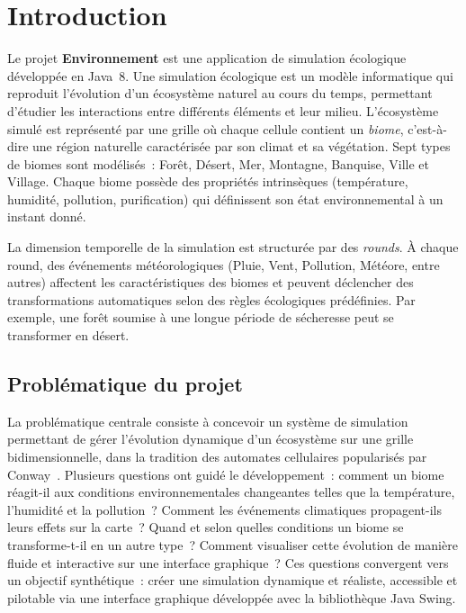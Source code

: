 \section{Introduction}
\label{sec:introduction}

Le projet \textbf{Environnement} est une application de simulation écologique
développée en Java~8. Une simulation écologique est un modèle informatique qui
reproduit l'évolution d'un écosystème naturel au cours du temps, permettant
d'étudier les interactions entre différents éléments et leur milieu. L'écosystème
simulé est représenté par une grille où chaque cellule contient un \emph{biome},
c'est-à-dire une région naturelle caractérisée par son climat et sa végétation.
Sept types de biomes sont modélisés~: Forêt, Désert, Mer, Montagne, Banquise,
Ville et Village. Chaque biome possède des propriétés intrinsèques (température,
humidité, pollution, purification) qui définissent son état environnemental à
un instant donné.

La dimension temporelle de la simulation est structurée par des \emph{rounds}.
À chaque round, des événements météorologiques (Pluie, Vent, Pollution, Météore,
entre autres) affectent les caractéristiques des biomes et peuvent déclencher
des transformations automatiques selon des règles écologiques prédéfinies. Par
exemple, une forêt soumise à une longue période de sécheresse peut se transformer
en désert.

\subsection{Problématique du projet}
\label{subsec:problematique}

La problématique centrale consiste à concevoir un système de simulation permettant
de gérer l'évolution dynamique d'un écosystème sur une grille bidimensionnelle,
dans la tradition des automates cellulaires popularisés par Conway~\cite{gardner1970life}.
Plusieurs questions ont guidé le développement~: comment un biome réagit-il aux
conditions environnementales changeantes telles que la température, l'humidité et
la pollution~? Comment les événements climatiques propagent-ils leurs effets sur
la carte~? Quand et selon quelles conditions un biome se transforme-t-il en un
autre type~? Comment visualiser cette évolution de manière fluide et interactive
sur une interface graphique~?
Ces questions convergent vers un objectif synthétique~: créer une simulation
dynamique et réaliste, accessible et pilotable via une interface graphique
développée avec la bibliothèque Java Swing.

